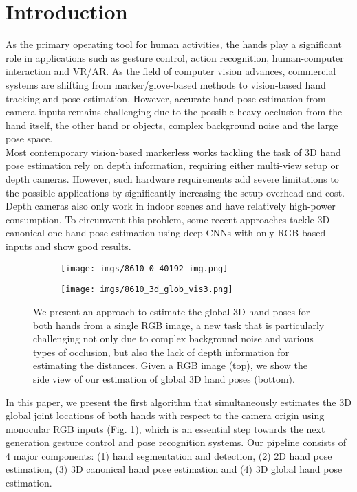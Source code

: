 \documentclass[10pt,twocolumn,letterpaper]{article}
\begin{document}
\section{Introduction}
\indent As the primary operating tool for human activities, the hands play a significant role in applications such as gesture control, action recognition, human-computer interaction and VR/AR. As the field of computer vision advances, commercial systems \cite{leapmotion,hololens2,htcvive,oculus} are shifting from marker/glove-based methods to vision-based hand tracking and pose estimation. However, accurate hand pose estimation from camera inputs remains challenging due to the possible heavy occlusion from the hand itself, the other hand or objects, complex background noise and the large pose space.\\
\indent Most contemporary vision-based markerless works tackling the task of 3D hand pose estimation rely on depth information, requiring either multi-view setup or depth cameras. However, such hardware requirements add severe limitations to the possible applications by significantly increasing the setup overhead and cost. Depth cameras also only work in indoor scenes and have relatively high-power consumption. To circumvent this problem, some recent approaches tackle 3D canonical one-hand pose estimation using deep CNNs with only RGB-based inputs and show good results.\\
\begin{figure}
  \begin{subfigure}[b]{\linewidth}
  \centering
  \texttt{[image: imgs/8610\_0\_40192\_img.png]}
  \end{subfigure}
  \begin{subfigure}[b]{\linewidth}
  \centering
  \vspace{0.1cm}
  \texttt{[image: imgs/8610\_3d\_glob\_vis3.png]}
  \end{subfigure}
  \caption{We present an approach to estimate the global 3D hand poses for both hands from a single RGB image, a new task that is particularly challenging not only due to complex background noise and various types of occlusion, but also the lack of depth information for estimating the distances. Given a RGB image (top), we show the side view of our estimation of global 3D hand poses (bottom).}
  \label{fig:intro_img}
\end{figure}
\indent In this paper, we present the first algorithm that simultaneously estimates the 3D global joint locations of both hands with respect to the camera origin using monocular RGB inputs (Fig. \ref{fig:intro_img}), which is an essential step towards the next generation gesture control and pose recognition systems. Our pipeline consists of 4 major components: (1) hand segmentation and detection, (2) 2D hand pose estimation, (3) 3D canonical hand pose estimation and (4) 3D global hand pose estimation.\\
\end{document}
